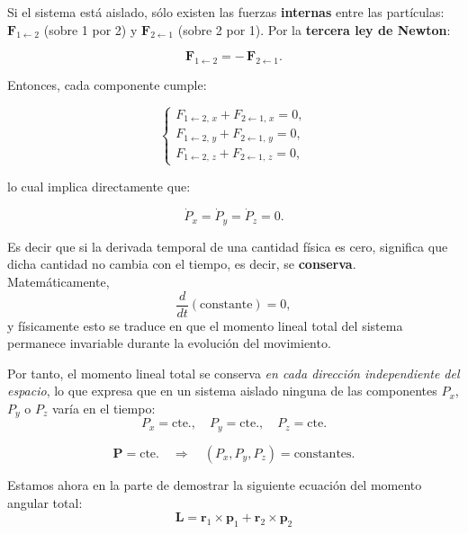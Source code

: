 \documentclass{article}
\begin{document}
Si el sistema está aislado, sólo existen las fuerzas \textbf{internas} entre las partículas:
\(\boldsymbol{F}_{1\leftarrow2}\) (sobre 1 por 2) y \(\boldsymbol{F}_{2\leftarrow1}\) (sobre 2 por 1).  
Por la \textbf{tercera ley de Newton}:

\[
\boldsymbol{F}_{1\leftarrow2} = -\,\boldsymbol{F}_{2\leftarrow1}.
\]

Entonces, cada componente cumple:

\[
\begin{cases}
F_{1\leftarrow2,\,x} + F_{2\leftarrow1,\,x} = 0, \\[4pt]
F_{1\leftarrow2,\,y} + F_{2\leftarrow1,\,y} = 0, \\[4pt]
F_{1\leftarrow2,\,z} + F_{2\leftarrow1,\,z} = 0,
\end{cases}
\]

lo cual implica directamente que:

\begin{equation}
\dot{P}_x = \dot{P}_y = \dot{P}_z = 0.
\label{eq:conservacion-P-escalar}
\end{equation}

Es decir que si la derivada temporal de una cantidad física es cero, significa que dicha cantidad no cambia con el tiempo, es decir, se \textbf{conserva}.  
Matemáticamente,
\[
\frac{d}{dt}(\text{constante}) = 0,
\]
y físicamente esto se traduce en que el momento lineal total del sistema permanece invariable durante la evolución del movimiento.

Por tanto, el momento lineal total se conserva \emph{en cada dirección independiente del espacio}, lo que expresa que en un sistema aislado ninguna de las componentes \(P_x\), \(P_y\) o \(P_z\) varía en el tiempo:
\[
\boxed{
P_x = \text{cte.}, \quad
P_y = \text{cte.}, \quad
P_z = \text{cte.}
}
\]


\[
\boxed{
\boldsymbol{P} = \text{cte.} \quad \Rightarrow \quad 
(P_x, P_y, P_z) = \text{constantes.}
}
\]



Estamos ahora en la parte de demostrar la siguiente ecuación del momento angular total:
\begin{equation}
\boldsymbol{L}=\boldsymbol{r}_1\times\boldsymbol{p}_1+\boldsymbol{r}_2\times\boldsymbol{p}_2
\label{eq:def-L-matrices}
\end{equation}
\end{document}
